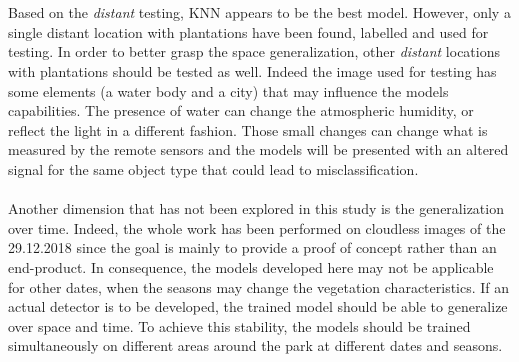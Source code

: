 \documentclass[a4paper, 12pt]{article}
\begin{document}
    \\
    \\
    Based on the \textit{distant} testing, KNN appears to be the best model. However, only a single distant location with plantations have been found, labelled and used for testing. In order to better grasp the space generalization, other \textit{distant} locations with plantations should be tested as well. Indeed the image used for testing has some elements (a water body and a city) that may influence the models capabilities. The presence of water can change the atmospheric humidity, or reflect the light in a different fashion. Those small changes can change what is measured by the remote sensors and the models will be presented with an altered signal for the same object type that could lead to misclassification.
    \\
    \\
    Another dimension that has not been explored in this study is the generalization over time. Indeed, the whole work has been performed on cloudless images of the 29.12.2018 since the goal is mainly to provide a proof of concept rather than an end-product. In consequence, the models developed here may not be applicable for other dates, when the seasons may change the vegetation characteristics. If an actual detector is to be developed, the trained model should be able to generalize over space and time. To achieve this stability, the models should be trained simultaneously on different areas around the park at different dates and seasons.
\end{document}
